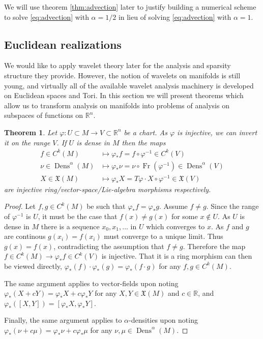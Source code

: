 \documentclass[letterpaper, 12 pt]{amsart}
\newcommand{\R}{\mathbb{R}}
\newtheorem{thm}{Theorem}[section]
\DeclareMathOperator{\Fr}{Fr}
\DeclareMathOperator{\Dens}{Dens}
\begin{document}
  We will use theorem \ref{thm:advection} later to justify building
  a numerical scheme to solve \eqref{eq:advection} with $\alpha = 1/2$
  in lieu of solving \eqref{eq:advection} with $\alpha = 1$.

\subsection{Euclidean realizations}
\label{sec:euclidean}
  We would like to apply wavelet theory later for the
  analysis and sparsity structure they provide.
  However, the notion of wavelets on manifolds is still young,
  and virtually all of the available wavelet analysis machinery
  is developed on Euclidean spaces and Tori.
  In this section we will present theorems which allow
  us to transform analysis on manifolds into problems
  of analysis on subspaces of functions on $\R^n$.

\begin{thm}
  \label{thm:Euclidean}
  Let $\varphi:U \subset M \to V \subset \R^n$ be a chart.
  As $\varphi$ is injective, we can invert it on the range $V$.
  If $U$ is dense in $M$ then the maps
  \begin{align*}
    f \in C^k(M) &\mapsto \varphi_*f = f \circ \varphi^{-1} \in C^k(V) \\
    \nu \in \Dens^\alpha(M) &\mapsto \varphi_* \nu = \nu \circ \Fr(\varphi^{-1}) \in \Dens^\alpha(V) \\
    X \in \mathfrak{X}(M) &\mapsto \varphi_* X = T\varphi \cdot X \circ \varphi^{-1} \in \mathfrak{X}(V)
  \end{align*}
  are injective ring/vector-space/Lie-algebra morphisms respectively.
  \end{thm}
  \begin{proof}
    Let $f,g \in C^k(M)$ be such that $\varphi_* f = \varphi_*g$.
    Assume $f \neq g$.
    Since the range of $\varphi^{-1}$ is $U$, it must be the case that
    $f(x) \neq g(x)$ for some $x \notin U$.
    As $U$ is dense in $M$ there is a sequence $x_0,x_1,\dots$ in $U$
    which converges to $x$.
    As $f$ and $g$ are continous $g(x_i) = f(x_i)$ must converge to a
    unique limit.  Thus $g(x) = f(x)$, contradicting the assumption
    that $f \neq g$.
    Therefore the map $f \in C^k(M) \to \varphi_* f \in C^k(V)$
    is injective.
    That it is a ring morphism can then be viewed directly, $\varphi_*(f) \cdot \varphi_*(g) = \varphi_*(f \cdot g)$ for any $f,g \in C^k(M)$.
    
    The same argument applies to vector-fields
    upon noting $\varphi_*(X+cY) = \varphi_*X + c \varphi_*Y$ for any $X,Y \in \mathfrak{X}(M)$ and $c \in \R$, and $\varphi_*([X,Y]) = [\varphi_*X, \varphi_*Y]$.

    Finally, the same argument applies to $\alpha$-densities
    upon noting $\varphi_*( \nu + c \mu) = \varphi_*\nu + c \varphi_* \mu$ for any $\nu,\mu \in \Dens^\alpha(M)$.
  \end{proof}
  
\end{document}

